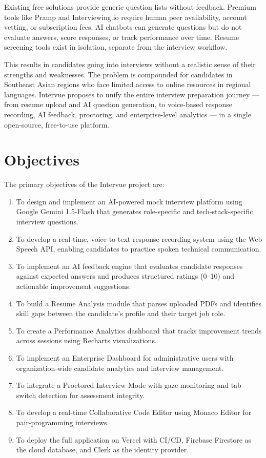 Existing free solutions provide generic question lists without feedback. Premium tools like
Pramp and Interviewing.io require human peer availability, account vetting, or subscription
fees. AI chatbots can generate questions but do not evaluate answers, score responses, or track
performance over time. Resume screening tools exist in isolation, separate from the interview
workflow.

This results in candidates going into interviews without a realistic sense of their strengths
and weaknesses. The problem is compounded for candidates in Southeast Asian regions who face
limited access to online resources in regional languages. Intervue proposes to unify the entire
interview preparation journey --- from resume upload and AI question generation, to voice-based
response recording, AI feedback, proctoring, and enterprise-level analytics --- in a single
open-source, free-to-use platform.

\section{Objectives}
The primary objectives of the Intervue project are:
\begin{enumerate}
	\item To design and implement an AI-powered mock interview platform using Google Gemini 1.5-Flash that generates role-specific and tech-stack-specific interview questions.
	\item To develop a real-time, voice-to-text response recording system using the Web Speech API, enabling candidates to practice spoken technical communication.
	\item To implement an AI feedback engine that evaluates candidate responses against expected answers and produces structured ratings (0--10) and actionable improvement suggestions.
	\item To build a Resume Analysis module that parses uploaded PDFs and identifies skill gaps between the candidate's profile and their target job role.
	\item To create a Performance Analytics dashboard that tracks improvement trends across sessions using Recharts visualizations.
	\item To implement an Enterprise Dashboard for administrative users with organization-wide candidate analytics and interview management.
	\item To integrate a Proctored Interview Mode with gaze monitoring and tab-switch detection for assessment integrity.
	\item To develop a real-time Collaborative Code Editor using Monaco Editor for pair-programming interviews.
	\item To deploy the full application on Vercel with CI/CD, Firebase Firestore as the cloud database, and Clerk as the identity provider.
\end{enumerate}

